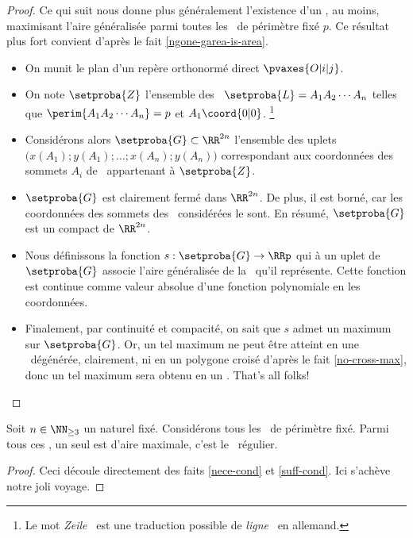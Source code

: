 \begin{proof}
	Ce qui suit nous donne plus généralement l'existence d'un \ngone, au moins, maximisant l'aire généralisée parmi toutes les \nlines\ de périmètre fixé $p$. Ce résultat plus fort convient d'après le fait \ref{ngone-garea-is-area}.
    \begin{itemize}
        \item On munit le plan d'un repère orthonormé direct $\pvaxes{O | i | j}$. 


        \item On note $\setproba{Z}$ l'ensemble des \nlines\ $\setproba{L} = A_1 A_2 \cdots A_n$ telles que
        $\perim{A_1 A_2 \cdots A_n} = p$
        et
        $A_1\coord{0 | 0}$.%
        \footnote{
        	Le mot \og \emph{Zeile} \fg\ est une traduction possible de \og \emph{ligne} \fg\ en allemand.
        }


        \item Considérons alors $\setproba{G} \subset \RR^{2n}$ l'ensemble des uplets $\big( x(A_1) ; y(A_1) ; \dots ; x(A_n) ; y(A_n) \big)$ correspondant aux coordonnées des sommets $A_i$ de \nlines\ appartenant à $\setproba{Z}$.
        
        
        \item $\setproba{G}$ est clairement fermé dans $\RR^{2n}$.
        De plus, il est borné, car les coordonnées des sommets des \nlines\ considérées le sont.        
        En résumé, $\setproba{G}$ est un compact de $\RR^{2n}$.


        \item Nous définissons la fonction $s: \setproba{G} \rightarrow \RRp$ qui à un uplet de $\setproba{G}$ associe l'aire généralisée de la \nline\ qu'il représente. 
        Cette fonction est continue comme valeur absolue d'une fonction polynomiale en les coordonnées.
       
        
        \item Finalement, par continuité et compacité, on sait que $s$ admet un maximum sur $\setproba{G}$.
        Or, un tel maximum ne peut être atteint en une \nline\ dégénérée, clairement, ni en un polygone croisé d'après le fait \ref{no-cross-max}, donc un tel maximum sera obtenu en un \ngone. That's all folks!
    \end{itemize}    
\end{proof}




\begin{fact}
    Soit $n \in \NN_{\geq3}$ un naturel fixé.
    Considérons tous les \ngones\  de périmètre fixé. Parmi tous ces \ngones, un seul est d'aire maximale, c'est le \ngone\ régulier.
\end{fact}


\begin{proof}
    Ceci découle directement des faits \ref{nece-cond} et \ref{suff-cond}.
    Ici s'achève notre joli voyage.
\end{proof}